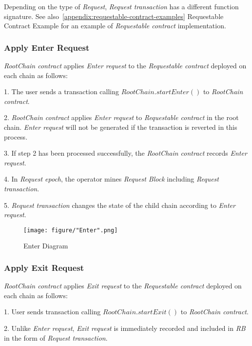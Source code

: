 \documentclass[letterpaper, 11pt]{article}
\begin{document}
\begin{CJK}{UTF8}{mj}
\begin{CJK}{UTF8}{mj}
Depending on the type of \emph{Request}, \emph{Request transaction} has a different function signature. See also~\ref{appendix:requestable-contract-examples} Requestable Contract Example for an example of \emph{Requestable contract} implementation.
\end{CJK}

\subsubsection{Apply Enter Request}
\begin{CJK}{UTF8}{mj}
\emph{RootChain contract} applies \emph{Enter request} to the \emph{Requestable contract} deployed on each chain as follows:

1. The user sends a transaction calling $RootChain.startEnter()$ to \emph{RootChain contract}.

2. \emph{RootChain contract} applies \emph{Enter request} to \emph{Requestable contract} in the root chain. \emph{Enter request} will not be generated if the transaction is reverted in this process.

3. If step 2 has been processed successfully, the \emph{RootChain contract} records \emph{Enter request}.

4. In \emph{Request epoch}, the operator mines \emph{Request Block} including \emph{Request transaction}.

5. \emph{Request transaction} changes the state of the child chain according to \emph{Enter request}.

\begin{figure}[H]
\centering
\texttt{[image: figure/"Enter".png]}
\caption{Enter Diagram}
\label{fig:enter-diagram}
\end{figure}

\end{CJK}

\subsubsection{Apply Exit Request}
\begin{CJK}{UTF8}{mj}
\emph{RootChain contract} applies \emph{Exit request} to the \emph{Requestable contract} deployed on each chain as follows:

1. User sends transaction calling $RootChain.startExit()$ to \emph{RootChain contract}.

2. Unlike \emph{Enter request}, \emph{Exit request} is immediately recorded and included in \emph{RB} in the form of \emph{Request transaction}.


\end{CJK}
\end{CJK}
\end{document}
